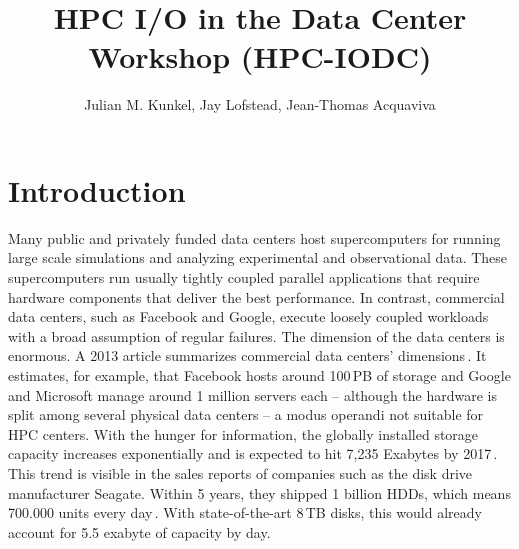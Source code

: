 \documentclass{llncs}
\begin{document}
\mainmatter


\author{Julian M. Kunkel, Jay Lofstead, Jean-Thomas Acquaviva}

\title{HPC I/O in the Data Center Workshop (HPC-IODC)}


\maketitle{}

\section{Introduction}
\label{sec:intro}

Many public and privately funded data centers host supercomputers for running large scale simulations and analyzing experimental and observational data.
These supercomputers run usually tightly coupled parallel applications that require hardware components that deliver the best performance.
In contrast, commercial data centers, such as Facebook and Google, execute loosely coupled workloads with a broad assumption of regular failures.
The dimension of the data centers is enormous.
A 2013 article summarizes commercial data centers' dimensions\,\cite{data13}.
It estimates, for example, that Facebook hosts around 100\,PB of storage and Google and Microsoft manage around 1 million servers each -- although the hardware is split among several physical data centers -- a modus operandi not suitable for HPC centers.
With the hunger for information, the globally installed storage capacity increases exponentially and is expected to hit 7,235 Exabytes by 2017\,\cite{EXA13}.
This trend is visible in the sales reports of companies such as the disk drive manufacturer Seagate. Within 5 years, they shipped 1 billion HDDs, which means 700.000 units every day\,\cite{SG14}.
With state-of-the-art 8\,TB disks, this would already account for 5.5 exabyte of capacity by day.
\end{document}
